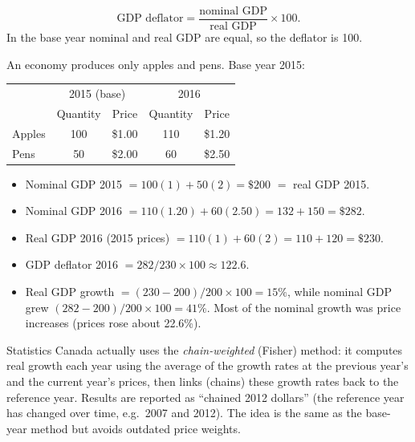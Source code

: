 \begin{definition}
\[
  \text{GDP deflator} = \frac{\text{nominal GDP}}{\text{real GDP}} \times 100.
\]
In the base year nominal and real GDP are equal, so the deflator is 100.
\end{definition}

\begin{example}
An economy produces only apples and pens. Base year 2015:
\begin{center}
\begin{tabular}{lcccc}
\toprule
 & \multicolumn{2}{c}{2015 (base)} & \multicolumn{2}{c}{2016} \\
 & Quantity & Price & Quantity & Price \\
\midrule
Apples & 100 & \$1.00 & 110 & \$1.20 \\
Pens & 50 & \$2.00 & 60 & \$2.50 \\
\bottomrule
\end{tabular}
\end{center}
\begin{itemize}
  \item Nominal GDP 2015 $= 100(1) + 50(2) = \$200$ $=$ real GDP 2015.
  \item Nominal GDP 2016 $= 110(1.20) + 60(2.50) = 132 + 150 = \$282$.
  \item Real GDP 2016 (2015 prices) $= 110(1) + 60(2) = 110 + 120 = \$230$.
  \item GDP deflator 2016 $= 282/230 \times 100 \approx 122.6$.
  \item Real GDP growth $= (230 - 200)/200 \times 100 = 15\%$, while nominal GDP grew
        $(282 - 200)/200 \times 100 = 41\%$. Most of the nominal growth was price
        increases (prices rose about 22.6\%).
\end{itemize}
\end{example}

\begin{remark}
Statistics Canada actually uses the \emph{chain-weighted} (Fisher) method: it computes
real growth each year using the average of the growth rates at the previous year's and
the current year's prices, then links (chains) these growth rates back to the reference
year. Results are reported as ``chained 2012 dollars'' (the reference year has changed
over time, e.g.\ 2007 and 2012). The idea is the same as the base-year method but avoids
outdated price weights.
\end{remark}

